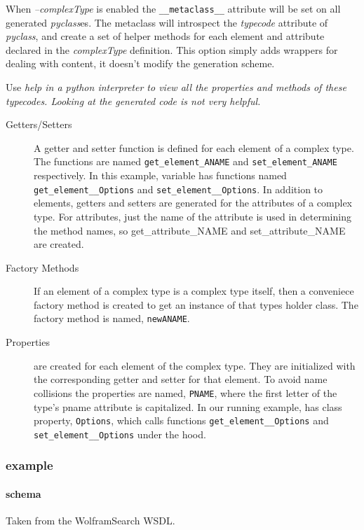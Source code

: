 When {\it --complexType} is enabled the \verb!__metaclass__! attribute will be
set on all generated {\it pyclass}es.  The metaclass will introspect the {\it
typecode} attribute of {\it pyclass}, and create a set of helper methods for
each element and attribute declared in the {\it complexType} definition.  This
option simply adds wrappers for dealing with content, it doesn't modify the
generation scheme.

Use \it{help} in a python interpreter to view all the properties and methods of
these typecodes.  Looking at the generated code is not very helpful.

\begin{description}
\item[Getters/Setters] A getter and setter function is defined for each element
of a complex type.  The functions are named \verb!get_element_ANAME! and
\verb!set_element_ANAME! respectively.  In this example, variable 
has functions named \verb!get_element__Options! and \verb!set_element__Options!.
 In addition to elements, getters and setters are generated for the attributes
 of a complex type.  For attributes, just the name of the attribute is used in
 determining the method names, so get_attribute_NAME and set_attribute_NAME are
 created.

\item[Factory Methods] If an element of a complex type is a complex type itself,
then a conveniece factory method is created to get an instance of that types
holder class.  The factory method is named, \verb!newANAME!.

\item[Properties]
are created for each element of the complex type.  They are initialized with the
corresponding getter and setter for that element.  To avoid name collisions the
properties are named, \verb!PNAME!, where the first letter of the type's pname
attribute is capitalized.  In our running example,  has class
property, \verb!Options!, which calls functions \verb!get_element__Options! and
\verb!set_element__Options! under the hood.

\end{description}

\subsubsection{example}
\paragraph{schema} 
Taken from the WolframSearch WSDL.

